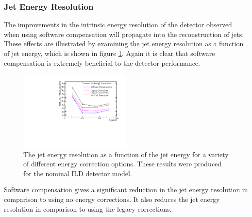 
\subsubsection{Jet Energy Resolution}

The improvements in the intrinsic energy resolution of the detector observed when using software compensation will propagate into the reconstruction of jets.  These effects are illustrated by examining the jet energy resolution as a function of jet energy, which is shown in figure \ref{fig:jersoftcomp}.  Again it is clear that software compensation is extremely beneficial to the detector performance.  

\begin{figure}
\includegraphics[width=0.5\textwidth]{EnergyEstimators/Plots/SoftComp/JetEnergyResolution/JER_vs_JetEnergy_Default.pdf}
\caption[The jet energy resolution as a function of the jet energy for a variety of different energy correction options.  These results were produced for the nominal ILD detector model.]{The jet energy resolution as a function of the jet energy for a variety of different energy correction options.  These results were produced for the nominal ILD detector model.}
\label{fig:jersoftcomp}
\end{figure}

Software compensation gives a significant reduction in the jet energy resolution in comparison to using no energy corrections.  It also reduces the jet energy resolution in comparison to using the legacy corrections.  

